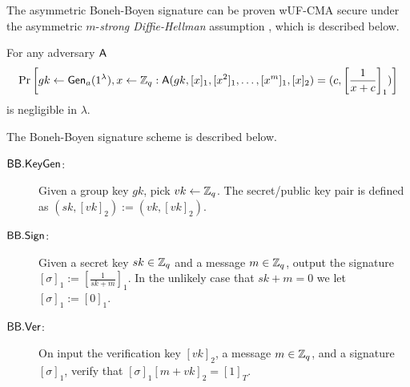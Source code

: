 The asymmetric Boneh-Boyen signature can be proven wUF-CMA secure under the asymmetric $m$-\emph{strong Diffie-Hellman} assumption \cite{JC:BonBoy08}, which is described below.

\begin{definition}
For any adversary $\mathsf{A}$
$$
\Pr\left[gk\gets\mathsf{Gen}_a(1^\lambda),x\gets\mathbb{Z}_q:\mathsf{A}(gk,[x]_1,[x^2]_1,\ldots,[x^m]_1,[x]_2)=(c,\left[\frac{1}{x+c}\right]_1)\right]
$$
is negligible in $\lambda$.
\end{definition}

The Boneh-Boyen signature scheme is described below.

\begin{description}
\item[$\mathsf{BB}.\mathsf{KeyGen}$:] Given a group key $gk$, pick $vk\gets\mathbb{Z}_q$. The secret/public key pair is defined as $(sk,[vk]_2):=(vk,[vk]_2)$.
\item[$\mathsf{BB}.\mathsf{Sign}$:] Given a secret key $sk\in\mathbb{Z}_q$ and a message $m\in\mathbb{Z}_q$, output the signature $[\sigma]_1:=\left[\frac{1}{sk+m}\right]_1$. In the unlikely case that $sk+m=0$ we let $[\sigma]_1:=[0]_1$.
\item[$\mathsf{BB}.\mathsf{Ver}$:] On input the verification key $[vk]_2$, a message $m\in\mathbb{Z}_q$, and a signature $[\sigma]_1$, verify that $[\sigma]_1[m+vk]_2=[1]_T$.
\end{description} 

